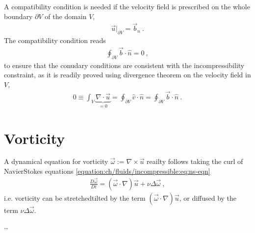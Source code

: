 \documentclass[letterpaper,10pt,english]{jupyterBook}
\begin{document}
\sphinxAtStartPar
A compatibility condition is needed if the velocity field is prescribed on the whole boundary \(\partial V\) of the domain \(V\),
\begin{equation*}
\begin{split}\vec{u}\bigg|_{\partial V} = \vec{b}_n \ .\end{split}
\end{equation*}
\sphinxAtStartPar
The compatibility condition reads
\begin{equation*}
\begin{split}\oint_{\partial V} \vec{b}  \cdot \hat{n} = 0 \ ,\end{split}
\end{equation*}
\sphinxAtStartPar
to ensure that the conudary conditions are consistent with the incompressibility constraint, as it is readily proved using divergence theorem on the velocity field in \(V\),
\begin{equation*}
\begin{split}0 \equiv \int_V \underbrace{\nabla \cdot \vec{u}}_{= 0} = \oint_{\partial V} \hat{v} \cdot \hat{n} = \oint_{\partial V} \vec{b} \cdot \hat{n} \ .\end{split}
\end{equation*}

\section{Vorticity}
\label{\detokenize{ch/fluids/incompressible:vorticity}}\label{\detokenize{ch/fluids/incompressible:fluid-mechanics-incompressible-vorticity}}
\sphinxAtStartPar
A dynamical equation for vorticity \(\vec{\omega} := \nabla \times \vec{u}\) reailty follows taking the curl of Navier\sphinxhyphen{}Stokes equations \eqref{equation:ch/fluids/incompressible:eq:ns-eqn}
\begin{equation}\label{equation:ch/fluids/incompressible:eq:vorticity}
\begin{split}\frac{D \vec{\omega}}{D t} = (\vec{\omega} \cdot \nabla) \vec{u} + \nu \Delta \vec{\omega} \ ,\end{split}
\end{equation}
\sphinxAtStartPar
i.e. vorticity can be stretched\sphinxhyphen{}tilted by the term \((\vec{\omega} \cdot \nabla) \vec{u}\), or diffused by the term \(\nu \Delta \vec{\omega}\).

\sphinxAtStartPar
…
\end{document}
